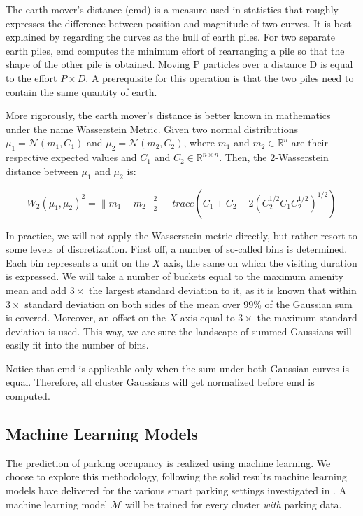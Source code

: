 The earth mover's distance (emd) is a measure used in statistics that roughly expresses the difference between position and magnitude of two curves.
It is best explained by regarding the curves as the hull of earth piles.
For two separate earth piles, emd computes the minimum effort of rearranging a pile so that the shape of the other pile is obtained.
Moving P particles over a distance D is equal to the effort $P \times D$.
A prerequisite for this operation is that the two piles need to contain the same quantity of earth.

More rigorously, the earth mover's distance is better known in mathematics under the name Wasserstein Metric.
Given two normal distributions $\mu_1=\mathcal{N}(m_1,C_1)$ and $\mu_2=\mathcal{N}(m_2,C_2)$, where $m_1$ and $m_2 \in \mathbb{R}^{n}$ are their respective expected values and $C_1$ and $C_2 \in \mathbb{R}^{n\times n}$.
Then, the 2-Wasserstein distance between $\mu_1$ and $\mu_2$ is:

\begin{equation}
W_2(\mu_1,\mu_2)^2={\lVert}m_1-m_2{\rVert}^2_2+trace(C_1+C_2-2(C_2^{1/2}C_1C_2^{1/2})^{1/2})
\end{equation}

In practice, we will not apply the Wasserstein metric directly, but rather resort to some levels of discretization.
First off, a number of so-called bins is determined.
Each bin represents a unit on the $X$ axis, the same on which the visiting duration is expressed.
We will take a number of buckets equal to the maximum amenity mean and add $3\times$ the largest standard deviation to it, as it is known that within $3\times$ standard deviation on both sides of the mean over 99\% of the Gaussian sum is covered.
Moreover, an offset on the $X$-axis equal to $3\times$ the maximum standard deviation is used.
This way, we are sure the landscape of summed Gaussians will easily fit into the number of bins.

Notice that emd is applicable only when the sum under both Gaussian curves is equal.
Therefore, all cluster Gaussians will get normalized before emd is computed.

\subsection{Machine Learning Models}
\label{realization:machine_learning_models}
The prediction of parking occupancy is realized using machine learning.
We choose to explore this methodology, following the solid results machine learning models have delivered for the various smart parking settings investigated in . A machine learning model $\mathcal{M}$ will be trained for every cluster \textit{with} parking data.

